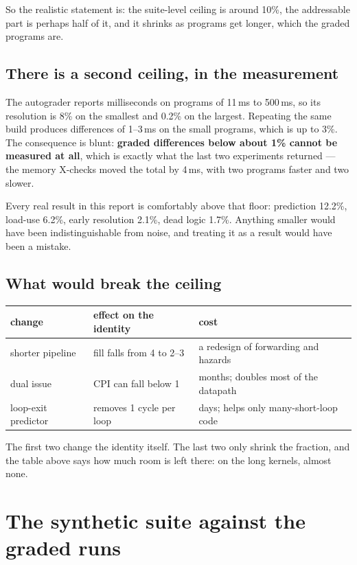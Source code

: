 \documentclass[11pt]{article}
\begin{document}
So the realistic statement is: the suite-level ceiling is around 10\%, the addressable part is
perhaps half of it, and it shrinks as programs get longer, which the graded programs are.

\subsection{There is a second ceiling, in the measurement}

The autograder reports milliseconds on programs of 11\,ms to 500\,ms, so its resolution is 8\%
on the smallest and 0.2\% on the largest. Repeating the same build produces differences of
1--3\,ms on the small programs, which is up to 3\%. The consequence is blunt: \textbf{graded
differences below about 1\% cannot be measured at all}, which is exactly what the last two
experiments returned --- the memory X-checks moved the total by 4\,ms, with two programs faster
and two slower.

Every real result in this report is comfortably above that floor: prediction 12.2\%, load-use
6.2\%, early resolution 2.1\%, dead logic 1.7\%. Anything smaller would have been
indistinguishable from noise, and treating it as a result would have been a mistake.

\subsection{What would break the ceiling}

\begin{center}
\begin{tabular}{lll}
\toprule
change & effect on the identity & cost \\
\midrule
shorter pipeline & fill falls from 4 to 2--3 & a redesign of forwarding and hazards \\
dual issue & $\mathrm{CPI}$ can fall below 1 & months; doubles most of the datapath \\
loop-exit predictor & removes 1 cycle per loop & days; helps only many-short-loop code \\
\bottomrule
\end{tabular}
\end{center}

The first two change the identity itself. The last two only shrink the fraction, and the table
above says how much room is left there: on the long kernels, almost none.

\section{The synthetic suite against the graded runs}
\end{document}
